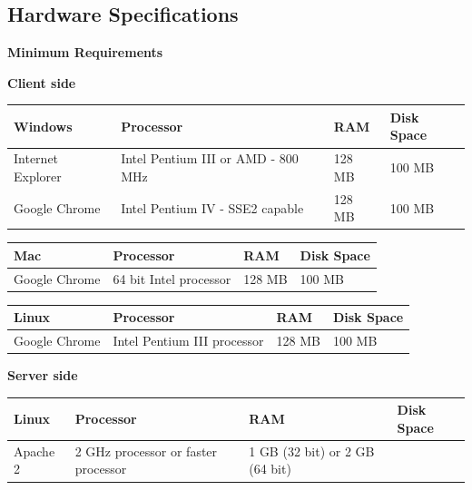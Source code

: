 \documentclass[10pt,onecolumn]{MainDocument}
\begin{document}
\subsection{Hardware Specifications }
\textbf{Minimum Requirements}
\begin{center}
	\textbf{Client side}\\
	\begin{tabular}{ | p{5cm} | p{4cm} | p{3cm} | p{3cm} |}
		\hline
		\textbf{Windows} & \textbf{Processor} & \textbf{RAM} & \textbf{Disk Space}\\ \hline
		Internet Explorer	&	Intel Pentium III	
		or AMD - 800 MHz	&	128 MB	&	100 MB		\\ \hline
		Google Chrome		&	Intel Pentium IV - 
		SSE2 capable		&	128 MB	&	100 MB		\\ \hline
	\end{tabular}
	
	
	\begin{tabular}{ | p{5cm} | p{4cm} | p{3cm} | p{3cm} |}
		\hline
		\textbf{Mac} & \textbf{Processor} & \textbf{RAM} & \textbf{Disk Space}\\			\hline
		Google Chrome		&	64 bit Intel  
		processor	       &   128 MB  &	100 MB	\\ \hline
	\end{tabular}
	
	
	\begin{tabular}{ | p{5cm} | p{4cm} | p{3cm} | p{3cm} |}
		\hline			\textbf{Linux} & \textbf{Processor} & \textbf{RAM} & \textbf{Disk Space}\\
		\hline
		Google Chrome		&	Intel Pentium III  
		processor	       &   128 MB  &	100 MB	\\ \hline
	\end{tabular}
	
	\textbf{Server side}\\
	\begin{tabular}{ | p{5cm} | p{4cm} | p{3cm} | p{3cm} |}
		\hline	
		\textbf{Linux} & \textbf{Processor} & \textbf{RAM} & \textbf{Disk Space}\\
		\hline
		Apache 2		&	2 GHz processor or faster  
		processor	       &   1 GB (32 bit) or 2 GB (64 bit)  &		\\ \hline
	\end{tabular}
\end{center}
\end{document}
